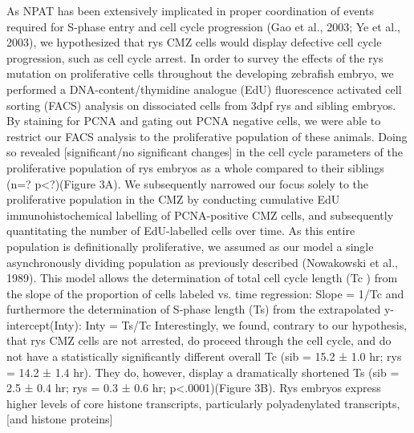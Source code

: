 As NPAT has been extensively implicated in proper coordination of events required for S-phase entry and cell cycle progression (Gao et al., 2003; Ye et al., 2003), we hypothesized that rys CMZ cells would display defective cell cycle progression, such as cell cycle arrest. In order to survey the effects of the rys mutation on proliferative cells throughout the developing zebrafish embryo, we performed a DNA-content/thymidine analogue (EdU) fluorescence activated cell sorting (FACS) analysis on dissociated cells from 3dpf rys and sibling embryos. By staining for PCNA and gating out PCNA negative cells, we were able to restrict our FACS analysis to the proliferative population of these animals. Doing so revealed [significant/no significant changes] in the cell cycle parameters of the proliferative population of rys embryos as a whole compared to their siblings (n=? p<?)(Figure 3A). We subsequently narrowed our focus solely to the proliferative population in the CMZ by conducting cumulative EdU immunohistochemical labelling of PCNA-positive CMZ cells, and subsequently quantitating the number of EdU-labelled cells over time. As this entire population is definitionally proliferative, we assumed as our model a single asynchronously dividing population as previously described (Nowakowski et al., 1989). This model allows the determination of total cell cycle length (Tc ) from the slope of the proportion of cells labeled vs. time regression:
Slope = 1/Tc
and furthermore the determination of S-phase length (Ts) from the extrapolated y-intercept(Inty):
Inty = Ts/Tc
Interestingly, we found, contrary to our hypothesis, that rys CMZ cells are not arrested, do proceed through the cell cycle, and do not have a statistically significantly different overall Tc (sib = 15.2 ± 1.0 hr; rys = 14.2 ± 1.4 hr). They do, however, display a dramatically shortened Ts (sib = 2.5 ± 0.4 hr; rys = 0.3 ± 0.6 hr; p<.0001)(Figure 3B).
Rys embryos express higher levels of core histone transcripts, particularly polyadenylated transcripts, [and histone proteins]
